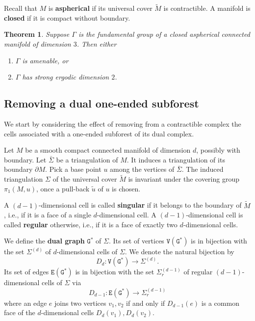 \documentclass[11pt]{amsart}
\theoremstyle{definition}
\theoremstyle{plain}
\newtheorem{thm}[definition]{Theorem}
\newcommand{\<}{\langle}
\renewcommand{\>}{\rangle}
\newcommand{\define}[1]{\textbf{#1}}
\newcommand\GGG{\mathtt{G}}
\newcommand\VVV{\mathtt{V}}
\newcommand\EEE{\mathtt{E}}
\newcommand{\Dual}{D}
\begin{document}
Recall that $M$ is \define{aspherical} if its universal cover $\tilde{M}$ is contractible.
A manifold is \define{closed} if it is compact without boundary.



\begin{thm}\label{erg dim 3-dim mfld}
  Suppose $\Gamma$ is the fundamental group of a closed aspherical connected manifold of
  dimension $3$. Then either
  \begin{enumerate}
  \item $\Gamma$ is amenable, or
  \item $\Gamma$ has strong ergodic dimension $2$.
  \end{enumerate}
\end{thm}

\subsection{Removing a dual one-ended subforest}
\label{subsect:remove dual of F}
We start by considering the effect of removing from a contractible complex the cells associated with a one-ended subforest of its dual complex.




Let $M$ be a smooth compact connected manifold of dimension $d$, possibly with boundary. Let $\bar\Sigma$ be a triangulation of $M$. It induces a triangulation of its boundary $\partial M$.
Pick a base point $u$ among the vertices of $\bar\Sigma$.
The induced  triangulation ${\Sigma}$ of the universal cover $\tilde{M}$ is invariant under the covering group $\pi_1(M,u)$, once a pull-back $\tilde{u}$ of $u$ is chosen.

A $(d-1)$-dimensional cell is called \define{singular} if it belongs to the boundary of $\tilde{M}$, i.e., if it is a face of a single $d$-dimensional cell.
A $(d-1)$-dimensional cell is called \define{regular} otherwise, i.e., if it is a face of exactly two $d$-dimensional cells.

We define the \define{dual graph} ${{\GGG}^*}$ of ${\Sigma}$.
Its set of vertices $\VVV({{\GGG}^*})$ is in bijection with the set ${\Sigma}^{(d)}$ of $d$-dimensional cells of ${\Sigma}$.
We denote the natural bijection by $$\Dual_d:\VVV({{\GGG}^*})\to {\Sigma}^{(d)}.$$
Its set of edges $\EEE({{\GGG}^*})$ is in bijection with the set ${\Sigma} ^{(d-1)}_r$ of regular $(d-1)$-dimensional cells of ${\Sigma}$ via
$$\Dual_{d-1}:  \EEE({{\GGG}^*})\to {\Sigma} ^{(d-1)}_r$$ where an edge $e$  joins two vertices $v_1, v_2$
 if and only if $\Dual_{d-1}(e)$  is a common face of the $d$-dimensional cells $\Dual_{d}(v_1), \Dual_{d}(v_2)$.
\end{document}

